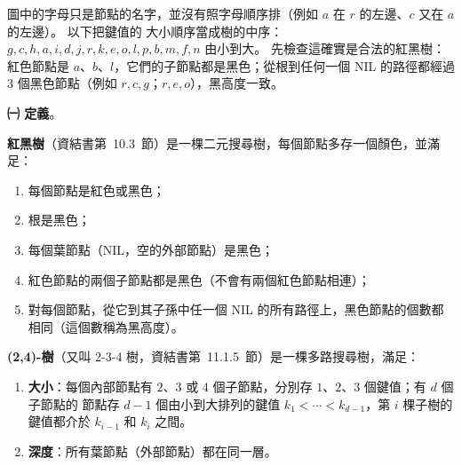 \begin{pastsoln}
圖中的字母只是節點的名字，並沒有照字母順序排（例如 $a$ 在 $r$ 的左邊、$c$ 又在 $a$ 的左邊）。 以下把鍵值的
大小順序當成樹的中序：$g, c, h, a, i, d, j, r, k, e, o, l, p, b, m, f, n$ 由小到大。 先檢查這確實是合法的紅黑樹：
紅色節點是 $a$、$b$、$l$，它們的子節點都是黑色；從根到任何一個 NIL 的路徑都經過 $3$ 個黑色節點（例如
$r, c, g$；$r, e, o$），黑高度一致。

\textbf{㈠ 定義}。

\textbf{紅黑樹}（資結書第~10.3~節）是一棵二元搜尋樹，每個節點多存一個顏色，並滿足：
\begin{enumerate}[label=(\arabic*)]
\item 每個節點是紅色或黑色；
\item 根是黑色；
\item 每個葉節點（NIL，空的外部節點）是黑色；
\item 紅色節點的兩個子節點都是黑色（不會有兩個紅色節點相連）；
\item 對每個節點，從它到其子孫中任一個 NIL 的所有路徑上，黑色節點的個數都相同（這個數稱為黑高度）。
\end{enumerate}

\textbf{(2,4)-樹}（又叫 2-3-4 樹，資結書第~11.1.5~節）是一棵多路搜尋樹，滿足：
\begin{enumerate}[label=(\arabic*)]
\item \textbf{大小}：每個內部節點有 $2$、$3$ 或 $4$ 個子節點，分別存 $1$、$2$、$3$ 個鍵值；有 $d$ 個子節點的
節點存 $d - 1$ 個由小到大排列的鍵值 $k_1 < \cdots < k_{d-1}$，第 $i$ 棵子樹的鍵值都介於 $k_{i-1}$ 和 $k_i$ 之間。
\item \textbf{深度}：所有葉節點（外部節點）都在同一層。
\end{enumerate}


\end{pastsoln}
